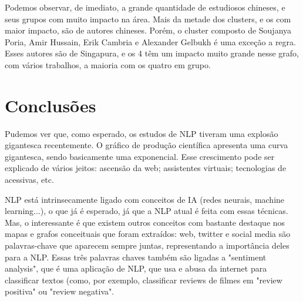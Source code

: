 Podemos observar, de imediato, a grande quantidade de estudiosos chineses, e seus grupos com muito impacto na área. Mais da metade dos clusters, e os com maior impacto, são de autores chineses. Porém, o cluster composto de Soujanya Poria, Amir Hussain, Erik Cambria e Alexander Gelbukh é uma exceção a regra. Esses autores são de Singapura, e os 4 têm um impacto muito grande nesse grafo, com vários trabalhos, a maioria com os quatro em grupo.

\section{Conclusões}

Pudemos ver que, como esperado, os estudos de NLP tiveram uma explosão gigantesca recentemente. O gráfico de produção científica apresenta uma curva gigantesca, sendo basicamente uma exponencial. Esse crescimento pode ser explicado de vários jeitos: ascensão da web; assistentes virtuais; tecnologias de acessivas, etc.

NLP está intrinsecamente ligado com conceitos de IA (redes neurais, machine learning...), o que já é esperado, já que a NLP atual é feita com essas técnicas. Mas, o interessante é que existem outros conceitos com bastante destaque nos mapas e grafos conceituais que foram extraídos: web, twitter e social media são palavras-chave que aparecem sempre juntas, representando a importância deles para a NLP. Essas três palavras chaves também são ligadas a "sentiment analysis", que é uma aplicação de NLP, que usa e abusa da internet para classificar textos (como, por exemplo, classificar reviews de filmes em "review positiva" ou "review negativa".

